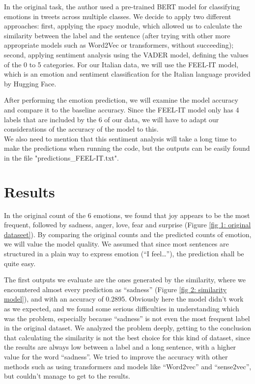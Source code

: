 In the original task, the author used a pre-trained BERT model for classifying emotions in tweets across multiple classes. We decide to apply two different approaches: first, applying the spacy module, which allowed us to  calculate the similarity between the label and the sentence (after trying with other more appropriate models such as Word2Vec or transformers, without succeeding); second, applying sentiment analysis using the VADER model, defining the values of the 0 to 5 categories.
For our Italian data, we will use the FEEL-IT model, which is an emotion and sentiment classification for the Italian language provided by Hugging Face. 

After performing the emotion prediction, we will examine the model accuracy and compare it to the baseline accuracy. Since the FEEL-IT model only has 4 labels that are included by the 6 of our data, we will have to adapt our considerations of the accuracy of the model to this. \\
We also need to mention that this sentiment analysis will take a long time to make the predictions when running the code, but the outputs can be easily found in the file "predictions\_FEEL-IT.txt".

\section{Results}
In the original count of the 6 emotions, we found that joy appears to be the most frequent, followed by sadness, anger, love, fear and surprise ({Figure \ref{fig 1: original dataseet}}). By comparing the original counts and the predicted counts of emotion, we will value the model quality. We assumed that since most sentences are structured in a plain way to express emotion (“I feel…”), the prediction shall be quite easy.

The first outputs we evaluate are the ones generated by the similarity, where we encountered almost every prediction as “sadness” ({Figure \ref{fig 2: similarity model}}), and with an accuracy of 0.2895. Obviously here the model didn’t work as we expected, and we found some serious difficulties in understanding which was the problem, especially because “sadness” is not even the most frequent label in the original dataset. 
We analyzed the problem deeply, getting to the conclusion that calculating the similarity is not the best choice for this kind of dataset, since the results are always low between a label and a long sentence, with a higher value for the word “sadness”. We tried to improve the accuracy with other methods such as using transformers and models like “Word2vec” and “sense2vec”, but couldn’t manage to get to the results. 

